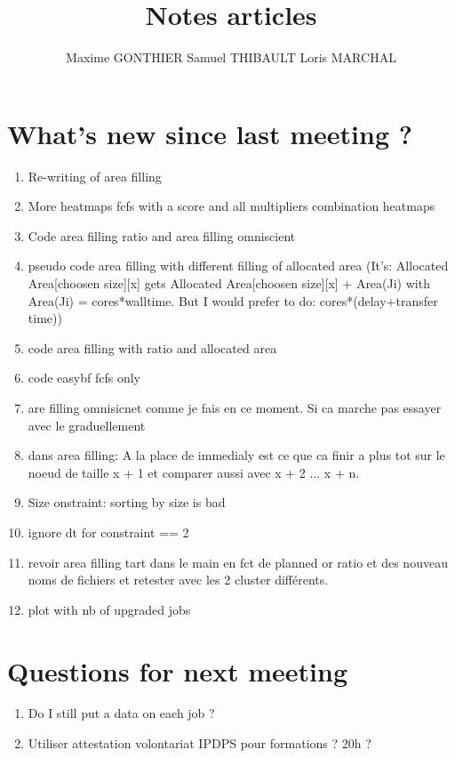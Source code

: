 \documentclass[a4paper]{article}
\title{Notes articles}
\author{Maxime GONTHIER Samuel THIBAULT Loris MARCHAL}
\begin{document}
\newpage


\section{What's new since last meeting ?}

	\begin{enumerate}
		\item Re-writing of area filling
		\item More heatmaps fcfs with a score and all multipliers combination heatmaps
		\item Code area filling ratio and area filling omniscient
		\item pseudo code area filling with different filling of allocated area (It's: Allocated Area[choosen size][x] gets Allocated Area[choosen size][x] + Area(Ji) with Area(Ji) = cores*walltime. But I would prefer to do: cores*(delay+transfer time))
		\item code area filling with ratio and allocated area
		\item code easybf fcfs only
		\item are filling omnisicnet comme je fais en ce moment. Si ca marche pas essayer avec le graduellement
		\item dans area filling: A la place de immedialy est ce que ca finir a plus tot sur le noeud de taille x + 1 et comparer aussi avec x + 2 ... x + n.
		\item Size onstraint: sorting by size is bad
		\item ignore dt for constraint == 2
		\item revoir area filling tart dans le main en fct de planned or ratio et des nouveau noms de fichiers et retester avec les 2 cluster différents.
		\item plot with nb of upgraded jobs
	\end{enumerate}
	
\section{Questions for next meeting}

	\begin{enumerate}
		\item Do I still put a data on each job ?
		\item Utiliser attestation volontariat IPDPS pour formations ? 20h ?
	\end{enumerate}
\end{document}
